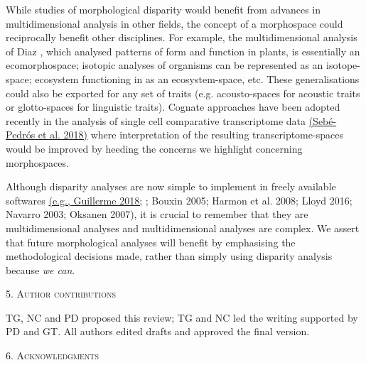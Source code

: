 \documentclass[12pt,letterpaper]{article}
\renewcommand{\section}[1]{%
\bigskip
\begin{center}
\begin{Large}
\normalfont\scshape #1
\medskip
\end{Large}
\end{center}}
\begin{document}
While studies of morphological disparity would benefit from advances in multidimensional analysis in other fields, the concept of a morphospace could reciprocally benefit other disciplines.
For example, the multidimensional analysis of Diaz \citealt{Diaz2016-mr}, which analysed patterns of form and function in plants, is essentially an ecomorphospace; isotopic analyses of organisms \citep{Jackson2011-kq} can be represented as an isotope-space; ecosystem functioning in \citealt{Donohue2013-bg} as an ecosystem-space, etc.
These generalisations could also be exported for any set of traits (e.g. acousto-spaces for acoustic traits or glotto-spaces for linguistic traits).
Cognate approaches have been adopted recently in the analysis of single cell comparative transcriptome data \href{https://paperpile.com/c/sTGYvp/856K}{(Sebé-Pedrós et al. 2018)} where interpretation of the resulting transcriptome-spaces would be improved by heeding the concerns we highlight concerning morphospaces.

Although disparity analyses are now simple to implement in freely available softwares \href{https://paperpile.com/c/sTGYvp/xDqf+J2G1+9JdS+9Zoi+bCsU+EmTR+2KmX}{(e.g., Guillerme 2018;} {; Bouxin 2005; Harmon et al. 2008; Lloyd 2016; Navarro 2003; Oksanen 2007)},
it is crucial to remember that they are multidimensional analyses and multidimensional analyses are complex.
We assert that future morphological analyses will benefit by emphasising the methodological decisions made, rather than simply using disparity analysis because \emph{we can}.

\hypertarget{author-contributions}{%
\section{5. Author contributions}\label{author-contributions}}

TG, NC and PD proposed this review; TG and NC led the writing supported by PD and GT. All authors edited drafts and approved the final version.

\hypertarget{acknowledgments}{%
\section{6. Acknowledgments}\label{acknowledgments}}
\end{document}
